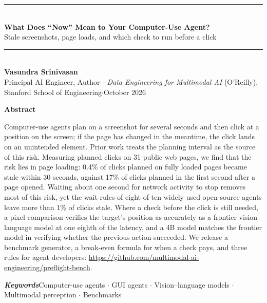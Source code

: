 \documentclass[10pt]{article}
\newcommand{\repo}{\url{https://github.com/multimodal-ai-engineering/preflight-bench}}
\begin{document}
\begin{center}
\rule{\textwidth}{1.1pt}\\[9pt]
{\fontsize{18}{23}\selectfont\bfseries What Does ``Now'' Mean to Your Computer-Use Agent?}\\[5pt]
{\fontsize{12.5}{16}\selectfont Stale screenshots, page loads, and which check to run before a click}\\[7pt]
\rule{\textwidth}{1.1pt}\\[14pt]
{\bfseries Vasundra Srinivasan}\\[2pt]
{\small Principal AI Engineer, Author---\textit{Data Engineering for Multimodal AI} (O'Reilly), Stanford School of Engineering\quad$\cdot$\quad October 2026}
\end{center}

\vspace{4pt}
\begin{center}{\large\bfseries Abstract}\end{center}
\vspace{-6pt}
\begin{list}{}{\leftmargin=0.55in\rightmargin=0.55in}\item[]
Computer-use agents plan on a screenshot for several seconds and then click at a position on the screen; if the page has changed in the meantime, the click lands on an unintended element. Prior work treats the planning interval as the source of this risk. Measuring planned clicks on 31 public web pages, we find that the risk lies in page loading: 0.4\% of clicks planned on fully loaded pages became stale within 30 seconds, against 17\% of clicks planned in the first second after a page opened. Waiting about one second for network activity to stop removes most of this risk, yet the wait rules of eight of ten widely used open-source agents leave more than 1\% of clicks stale. Where a check before the click is still needed, a pixel comparison verifies the target's position as accurately as a frontier vision--language model at one eighth of the latency, and a 4B model matches the frontier model in verifying whether the previous action succeeded. We release a benchmark generator, a break-even formula for when a check pays, and three rules for agent developers: \repo.
\end{list}

\vspace{2pt}
\noindent\textbf{\textit{Keywords}}\enspace Computer-use agents $\cdot$ GUI agents $\cdot$ Vision--language models $\cdot$ Multimodal perception $\cdot$ Benchmarks
\end{document}
